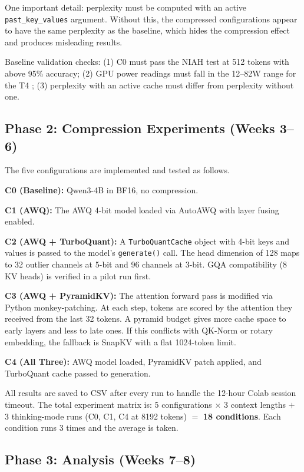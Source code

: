 \documentclass[conference]{IEEEtran}
\begin{document}
One important detail: perplexity must be computed with an active \texttt{past\_key\_values} argument. Without this, the compressed configurations appear to have the same perplexity as the baseline, which hides the compression effect and produces misleading results.

Baseline validation checks: (1) C0 must pass the NIAH test at 512 tokens with above 95\% accuracy; (2) GPU power readings must fall in the 12--82W range for the T4 \cite{wattcounts}; (3) perplexity with an active cache must differ from perplexity without one.

\subsection{Phase 2: Compression Experiments (Weeks 3--6)}

The five configurations are implemented and tested as follows.

\textbf{C0 (Baseline):} \mbox{Qwen3-4B} in BF16, no compression.

\textbf{C1 (AWQ):} The AWQ 4-bit model loaded via AutoAWQ with layer fusing enabled.

\textbf{C2 (AWQ + TurboQuant):} A \texttt{TurboQuantCache} object with 4-bit keys and values is passed to the model's \texttt{generate()} call. The head dimension of 128 maps to 32 outlier channels at 5-bit and 96 channels at 3-bit. GQA compatibility (8 KV heads) is verified in a pilot run first.

\textbf{C3 (AWQ + PyramidKV):} The attention forward pass is modified via Python monkey-patching. At each step, tokens are scored by the attention they received from the last 32 tokens. A pyramid budget gives more cache space to early layers and less to late ones. If this conflicts with QK-Norm or rotary embedding, the fallback is SnapKV \cite{snapkv} with a flat 1024-token limit.

\textbf{C4 (All Three):} AWQ model loaded, PyramidKV patch applied, and TurboQuant cache passed to generation.

All results are saved to CSV after every run to handle the 12-hour Colab session timeout. The total experiment matrix is: 5 configurations $\times$ 3 context lengths $+$ 3 thinking-mode runs (C0, C1, C4 at 8192 tokens) $=$ \textbf{18 conditions}. Each condition runs 3 times and the average is taken.

\subsection{Phase 3: Analysis (Weeks 7--8)}
\end{document}
